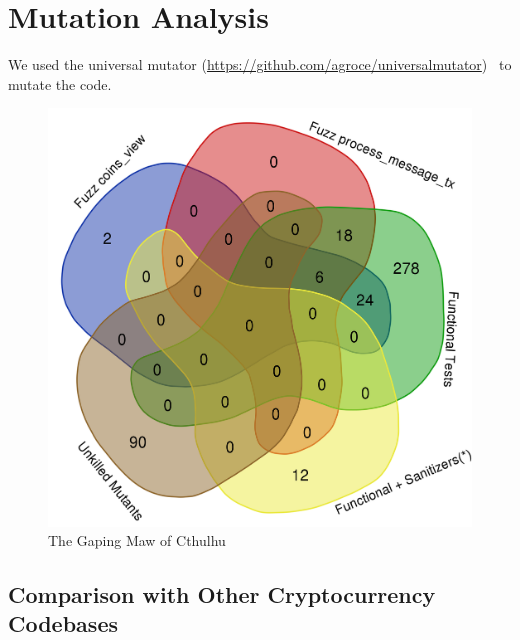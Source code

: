 \section{Mutation Analysis}

\begin{sloppypar}
We used the universal mutator
(\url{https://github.com/agroce/universalmutator})~\cite{regexpMut} to
mutate the code.
\end{sloppypar}

\begin{figure}
\vspace{2mm}
\includegraphics[width=1.9\columnwidth]{kill_pre_valgrind.png}
\caption{The Gaping Maw of Cthulhu}
\end{figure}

\subsection{Comparison with Other Cryptocurrency Codebases}